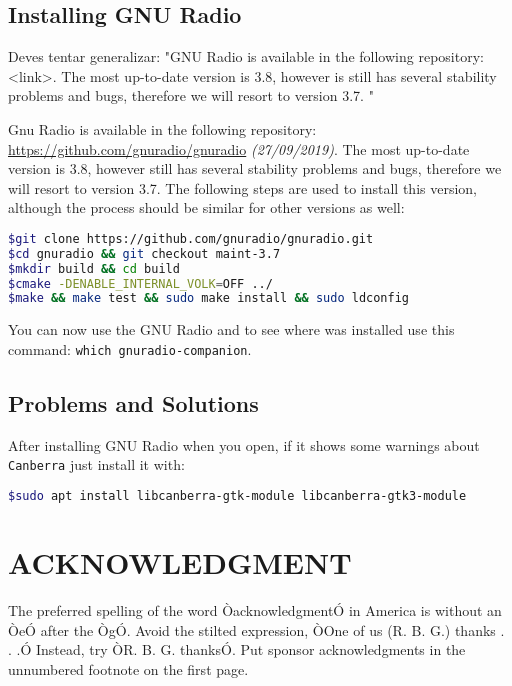 \documentclass[a4paper, 10pt, conference]{ieeeconf}      %
\begin{document}
\subsection{Installing GNU Radio}
Deves tentar generalizar: "GNU Radio is available in the following repository: <link>. The most up-to-date version is 3.8, however is still has several stability problems and bugs, therefore we will resort to version 3.7. "

Gnu Radio is available in the following repository: \url{https://github.com/gnuradio/gnuradio} \textit{(27/09/2019)}.  The most up-to-date version is 3.8, however still has several stability problems and bugs, therefore we will resort to version 3.7. The following steps are used to install this version, although the process should be similar for other versions as well:

\begin{lstlisting}[language=bash, breaklines]
$git clone https://github.com/gnuradio/gnuradio.git
$cd gnuradio && git checkout maint-3.7
$mkdir build && cd build
$cmake -DENABLE_INTERNAL_VOLK=OFF ../
$make && make test && sudo make install && sudo ldconfig
\end{lstlisting}

You can now use the GNU Radio and to see where was installed use this command: \verb|which gnuradio-companion|.

\subsection{Problems and Solutions}
After installing GNU Radio when you open, if it shows some warnings about \verb|Canberra| just install it with:
\begin{lstlisting}[language=bash, breaklines]
$sudo apt install libcanberra-gtk-module libcanberra-gtk3-module
\end{lstlisting}




\section*{ACKNOWLEDGMENT}

The preferred spelling of the word ÒacknowledgmentÓ in America is without an ÒeÓ after the ÒgÓ. Avoid the stilted expression, ÒOne of us (R. B. G.) thanks . . .Ó  Instead, try ÒR. B. G. thanksÓ. Put sponsor acknowledgments in the unnumbered footnote on the first page.



\end{document}
